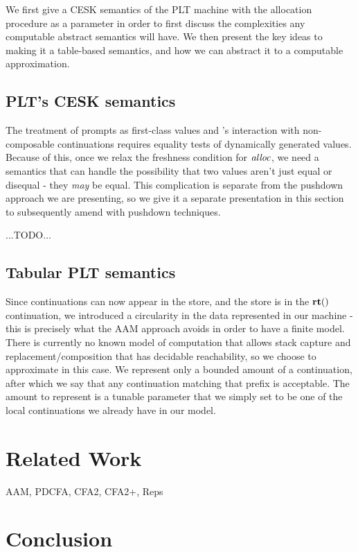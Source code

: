 \documentclass{llncs}
\newcommand{\Scribtexttt}[1]{{\texttt{#1}}}
\newcommand{\SColorize}[2]{\color{#1}{#2}}
\newcommand{\inColor}[2]{{\Scribtexttt{\SColorize{#1}{#2}}}}
\newcommand{\rackett}[1]{\inColor{black}{#1}}
\begin{document}
We first give a CESK semantics of the PLT machine with the allocation
procedure as a parameter in order to first discuss the complexities
any computable abstract semantics will have. We then present the key
ideas to making it a table-based semantics, and how we can abstract it
to a computable approximation.

\subsection{PLT's CESK semantics}

The treatment of prompts as first-class values and
\rackett{dynamic-wind}'s interaction with non-composable continuations
requires equality tests of dynamically generated values. Because of
this, once we relax the freshness condition for $\mathit{alloc}$, we need a
semantics that can handle the possibility that two values aren't just
equal or disequal - they \emph{may} be equal. This complication is
separate from the pushdown approach we are presenting, so we give it a
separate presentation in this section to subsequently amend with pushdown
techniques.

...TODO...

\subsection{Tabular PLT semantics}

Since continuations can now appear in the store, and the store is in
the $\mathbf{rt}()$ continuation, we introduced a circularity in the data
represented in our machine - this is precisely what the AAM approach
avoids in order to have a finite model. There is currently no known
model of computation that allows stack capture and
replacement/composition that has decidable reachability, so we choose
to approximate in this case. We represent only a bounded amount of a
continuation, after which we say that any continuation matching that
prefix is acceptable. The amount to represent is a tunable parameter
that we simply set to be one of the local continuations we already
have in our model.

\section{Related Work}

AAM, PDCFA, CFA2, CFA2+, Reps

\section{Conclusion}



\end{document}
